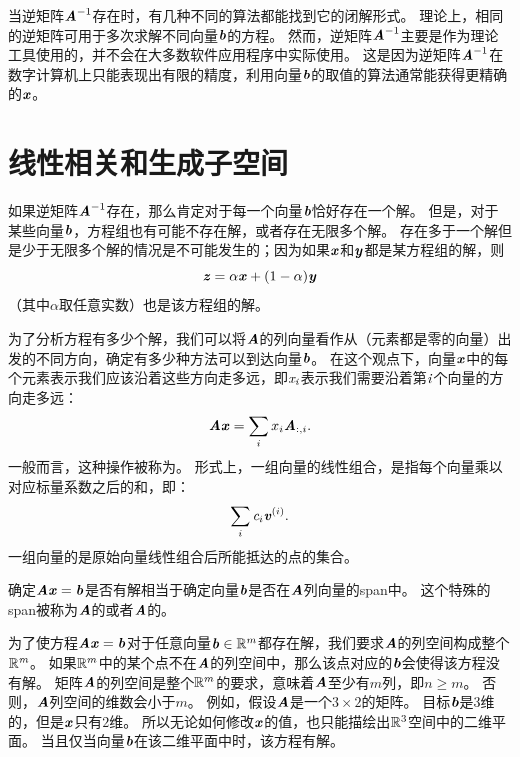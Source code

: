 当逆矩阵$\MA^{-1}$存在时，有几种不同的算法都能找到它的闭解形式。
理论上，相同的逆矩阵可用于多次求解不同向量$\Vb$的方程。
然而，逆矩阵$\MA^{-1}$主要是作为理论工具使用的，并不会在大多数软件应用程序中实际使用。
这是因为逆矩阵$\MA^{-1}$在数字计算机上只能表现出有限的精度，利用向量$\Vb$的取值的算法通常能获得更精确的$\Vx$。





\section{线性相关和生成子空间}
\label{sec:linear_dependence_and_span}

如果逆矩阵$\MA^{-1}$存在，那么肯定对于每一个向量$\Vb$恰好存在一个解。
但是，对于某些向量$\Vb$，方程组也有可能不存在解，或者存在无限多个解。
存在多于一个解但是少于无限多个解的情况是不可能发生的；因为如果$\Vx$和$\Vy$都是某方程组的解，则
\begin{equation}
\Vz=\alpha \Vx + (1-\alpha) \Vy
\end{equation}
（其中$\alpha$取任意实数）也是该方程组的解。


为了分析方程有多少个解，我们可以将$\MA$的列向量看作从（元素都是零的向量）出发的不同方向，确定有多少种方法可以到达向量$\Vb$。
在这个观点下，向量$\Vx$中的每个元素表示我们应该沿着这些方向走多远，即$\Sx_{\Si}$表示我们需要沿着第$\Si$个向量的方向走多远：
\begin{equation}
\MA \Vx = \sum_i x_i \MA_{:,i}.
\end{equation}
一般而言，这种操作被称为。
形式上，一组向量的线性组合，是指每个向量乘以对应标量系数之后的和，即：
\begin{equation}
    \sum_i \Sc_i \Vv^{(i)}.
\end{equation}
一组向量的是原始向量线性组合后所能抵达的点的集合。


确定$\MA\Vx=\Vb$是否有解相当于确定向量$\Vb$是否在$\MA$列向量的\gls{span}中。
这个特殊的\gls{span}被称为$\MA$的或者$\MA$的。


为了使方程$\MA \Vx=\Vb$对于任意向量$\Vb \in \SetR^m$都存在解，我们要求$\MA$的列空间构成整个$\SetR^{\Sm}$。
如果$\SetR^m$中的某个点不在$\MA$的列空间中，那么该点对应的$\Vb$会使得该方程没有解。
矩阵$\MA$的列空间是整个$\SetR^m$的要求，意味着$\MA$至少有$m$列，即$n\geq m$。
否则，$\MA$列空间的维数会小于$m$。
例如，假设$\MA$是一个$3\times 2$的矩阵。
目标$\Vb$是$3$维的，但是$\Vx$只有$2$维。
所以无论如何修改$\Vx$的值，也只能描绘出$\SetR^3$空间中的二维平面。
当且仅当向量$\Vb$在该二维平面中时，该方程有解。



